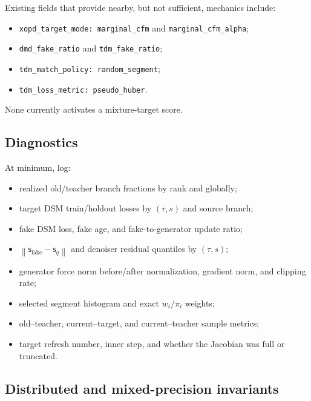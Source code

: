 \documentclass[11pt,a4paper]{article}
\newcommand{\norm}[1]{\left\lVert #1 \right\rVert}
\newcommand{\fake}{\mathrm{fake}}
\newcommand{\score}{\mathsf{s}}
\theoremstyle{plain}
\theoremstyle{definition}
\begin{document}
Existing fields that provide nearby, but not sufficient, mechanics include:
\begin{itemize}[leftmargin=1.5em,nosep]
\item \texttt{xopd\_target\_mode: marginal\_cfm} and
      \texttt{marginal\_cfm\_alpha};
\item \texttt{dmd\_fake\_ratio} and \texttt{tdm\_fake\_ratio};
\item \texttt{tdm\_match\_policy: random\_segment};
\item \texttt{tdm\_loss\_metric: pseudo\_huber}.
\end{itemize}
None currently activates a mixture-target score.

\subsection{Diagnostics}

At minimum, log:
\begin{itemize}[leftmargin=1.5em]
\item realized old/teacher branch fractions by rank and globally;
\item target DSM train/holdout losses by $(\tau,s)$ and source branch;
\item fake DSM loss, fake age, and fake-to-generator update ratio;
\item $\norm{\score_{\fake}-\score_q}$ and denoiser residual quantiles by $(\tau,s)$;
\item generator force norm before/after normalization, gradient norm, and clipping rate;
\item selected segment histogram and exact $w_i/\pi_i$ weights;
\item old--teacher, current--target, and current--teacher sample metrics;
\item target refresh number, inner step, and whether the Jacobian was full or truncated.
\end{itemize}

\subsection{Distributed and mixed-precision invariants}
\end{document}
